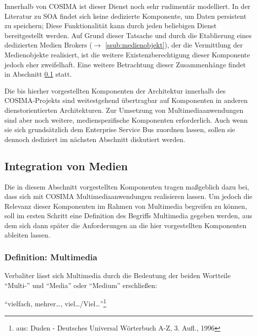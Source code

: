   Innerhalb von COSIMA ist dieser Dienst noch sehr rudimentär modelliert. In der Literatur zu SOA findet sich keine dedizierte Komponente, um Daten persistent zu speichern; Diese Funktionalität kann durch jeden beliebigen Dienst bereitgestellt werden. Auf Grund dieser Tatsache und durch die Etablierung eines dedizierten Medien Brokers ($\to$ \ref{ssub:medienobjekt}), der die Vermittlung der Medienobjekte realisiert, ist die weitere Existenzberechtigung dieser Komponente jedoch eher zweifelhaft. Eine weitere Betrachtung dieser Zusammenhänge findet in Abschnitt \ref{sub:integration_von_medien} statt.
  

  Die bis hierher vorgestellten Komponenten der Architektur innerhalb des COSIMA-Projekts sind weitestgehend übertragbar auf Komponenten in anderen dienstorientierten Architekturen. Zur Umsetzung von Multimediaanwendungen sind aber noch weitere, medienspezifische Komponenten erforderlich. Auch wenn sie sich grundsätzlich dem Enterprise Service Bus zuordnen lassen, sollen sie dennoch dediziert im nächsten Abschnitt diskutiert werden.


\subsection{Integration von Medien} %
\label{sub:integration_von_medien}

  Die in diesem Abschnitt vorgestellten Komponenten tragen maßgeblich dazu bei, dass sich mit COSIMA Multimediaanwendungen realisieren lassen. Um jedoch die Relevanz dieser Komponenten im Rahmen von Multimedia begreifen zu können, soll im ersten Schritt eine Definition des Begriffs Multimedia gegeben werden, aus dem sich dann später die Anforderungen an die hier vorgestellten Komponenten ableiten lassen.
  
\subsubsection{Definition: Multimedia} %
\label{ssub:definition_multimedia}
  
  Verbaliter lässt sich Multimedia durch die Bedeutung der beiden Wortteile "`Multi-"' und "`Media"' oder "`Medium"' erschließen:

  \begin{definition}[Multi-]\label{def:multi_}
    "`vielfach, mehrer\ldots, viel\ldots/Viel\ldots"'\footnote{aus: Duden - Deutsches Universal Wörterbuch A-Z, 3. Aufl., 1996}
  \end{definition}
  
